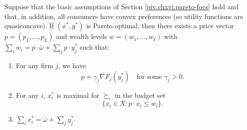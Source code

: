 \begin{prop}
    Suppose that the basic assumptions of Section \ref{piv.chxvi.pareto-focs} hold and that, in addition, all consumers have convex preferences (so utility functions are quasiconcave). If $(x^*, y^*)$ is Pareto optimal, then there exists a price vector $p = (p_1, \dots, p_L)$ and wealth levels $w = (w_1, \dots, w_I)$ with $\sum_i w_i = p \cdot \bar{\omega} + \sum_j p \cdot y^*_j$ such that:
    \begin{enumerate}
        \item For any firm $j$, we have
        \begin{equation*}
            p = \gamma_j \nabla F_j (y^*_j) \quad \text{for some } \gamma_j > 0.
        \end{equation*}

        \item For any $i$, $x^*_i$ is maximal for $\succsim_i$ in the budget set
        \begin{equation*}
            \{x_i \in X: p \cdot x_i \leq w_i\}.
        \end{equation*}

        \item $\sum_i x^*_i = \bar{\omega} + \sum_j y^*_j$.
    \end{enumerate}
\end{prop}
